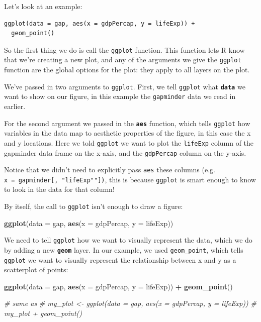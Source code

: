 \documentclass[]{book}
\newenvironment{Shaded}{\begin{snugshade}}{\end{snugshade}}
\newcommand{\KeywordTok}[1]{\textcolor[rgb]{0.13,0.29,0.53}{\textbf{#1}}}
\newcommand{\DataTypeTok}[1]{\textcolor[rgb]{0.13,0.29,0.53}{#1}}
\newcommand{\StringTok}[1]{\textcolor[rgb]{0.31,0.60,0.02}{#1}}
\newcommand{\CommentTok}[1]{\textcolor[rgb]{0.56,0.35,0.01}{\textit{#1}}}
\newcommand{\OperatorTok}[1]{\textcolor[rgb]{0.81,0.36,0.00}{\textbf{#1}}}
\newcommand{\NormalTok}[1]{#1}
\begin{document}
Let's look at an example:

\begin{verbatim}
ggplot(data = gap, aes(x = gdpPercap, y = lifeExp)) +
  geom_point()
\end{verbatim}

So the first thing we do is call the \texttt{ggplot} function. This
function lets R know that we're creating a new plot, and any of the
arguments we give the \texttt{ggplot} function are the global options
for the plot: they apply to all layers on the plot.

We've passed in two arguments to \texttt{ggplot}. First, we tell
\texttt{ggplot} what \textbf{\texttt{data}} we want to show on our
figure, in this example the \texttt{gapminder} data we read in earlier.

For the second argument we passed in the \textbf{\texttt{aes}} function,
which tells \texttt{ggplot} how variables in the data map to aesthetic
properties of the figure, in this case the x and y locations. Here we
told \texttt{ggplot} we want to plot the \texttt{lifeExp} column of the
gapminder data frame on the x-axis, and the \texttt{gdpPercap} column on
the y-axis.

Notice that we didn't need to explicitly pass \texttt{aes} these columns
(e.g. \texttt{x\ =\ gapminder{[},\ "lifeExp""{]})}, this is because
\texttt{ggplot} is smart enough to know to look in the data for that
column!

By itself, the call to \texttt{ggplot} isn't enough to draw a figure:

\begin{Shaded}
\begin{Highlighting}[]
\KeywordTok{ggplot}\NormalTok{(}\DataTypeTok{data =}\NormalTok{ gap, }\KeywordTok{aes}\NormalTok{(}\DataTypeTok{x =}\NormalTok{ gdpPercap, }\DataTypeTok{y =}\NormalTok{ lifeExp))}
\end{Highlighting}
\end{Shaded}

We need to tell \texttt{ggplot} how we want to visually represent the
data, which we do by adding a new \textbf{\texttt{geom}} layer. In our
example, we used \texttt{geom\_point}, which tells \texttt{ggplot} we
want to visually represent the relationship between x and y as a
scatterplot of points:

\begin{Shaded}
\begin{Highlighting}[]
\KeywordTok{ggplot}\NormalTok{(}\DataTypeTok{data =}\NormalTok{ gap, }\KeywordTok{aes}\NormalTok{(}\DataTypeTok{x =}\NormalTok{ gdpPercap, }\DataTypeTok{y =}\NormalTok{ lifeExp)) }\OperatorTok{+}\StringTok{ }
\StringTok{  }\KeywordTok{geom_point}\NormalTok{()}

\CommentTok{# same as}
\CommentTok{# my_plot <- ggplot(data = gap, aes(x = gdpPercap, y = lifeExp))}
\CommentTok{# my_plot + geom_point()}
\end{Highlighting}
\end{Shaded}
\end{document}
